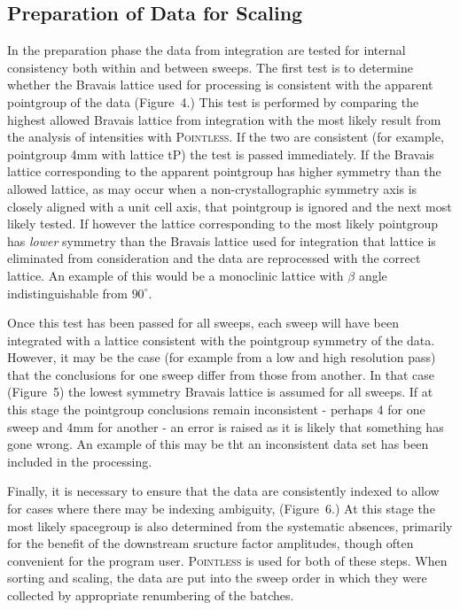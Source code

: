 \documentclass[preprint,pdf]{iucr}
\begin{document}
\subsection{Preparation of Data for Scaling}

In the preparation phase the data from integration are tested for
internal consistency both within and between sweeps. The first test is
to determine whether the Bravais lattice used for processing is
consistent with the apparent pointgroup of the data
(Figure~4.)
This test is performed by comparing the highest allowed Bravais
lattice from integration with the most likely result from 
the analysis of intensities with \textsc{Pointless}. If
the two are consistent (for example, pointgroup 4mm with lattice tP)
the test is passed immediately. If the Bravais lattice corresponding
to the apparent pointgroup has higher
symmetry than the allowed lattice, as may occur when a
non-crystallographic symmetry axis is closely aligned with a unit cell
axis, that pointgroup is ignored and the next most likely tested. 
If however the lattice corresponding to the most likely pointgroup has 
\emph{lower} symmetry than the
Bravais lattice used for integration that lattice is eliminated from
consideration and the data are reprocessed with the correct lattice.
An example of this would
be a monoclinic lattice with $\beta$ angle indistinguishable
from $90^{\circ}$. 

Once this test has been passed for all sweeps, each sweep will have been
integrated with a lattice consistent with the pointgroup symmetry of
the data. However, it may be the case (for example from a low and high
resolution pass) that the conclusions for one sweep differ from those
from another. In that case (Figure~5) the lowest
symmetry Bravais lattice
is assumed for all sweeps. If at this stage the pointgroup
conclusions remain inconsistent - perhaps 4 for one sweep and 
4mm for another - an error is raised as it is likely
that something has gone wrong. An example of this may be tht an
inconsistent data set has been included in the processing. 

Finally, it is necessary to ensure that the data are consistently
indexed to allow for cases where there may be indexing ambiguity,
(Figure~6.) At this stage the most likely
spacegroup is also determined from the systematic absences, primarily
for the benefit of the downstream sructure factor amplitudes, though
often convenient for the program user. \textsc{Pointless} is used for
both of these steps. When sorting and scaling, the
data are put into the sweep order in which they were collected by
appropriate renumbering of the batches.
\end{document}

